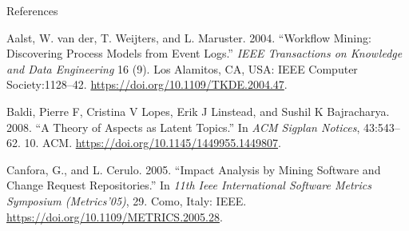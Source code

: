 \documentclass[10pt,ignorenonframetext,serif,onlymath]{beamer}
\begin{document}
\begin{frame}{References}
\protect\hypertarget{sec:references}{}

\hypertarget{refs}{}
\leavevmode\hypertarget{ref-Aalst-etal_2004}{}%
Aalst, W. van der, T. Weijters, and L. Maruster. 2004. “Workflow Mining:
Discovering Process Models from Event Logs.” \emph{IEEE Transactions on
Knowledge and Data Engineering} 16 (9). Los Alamitos, CA, USA: IEEE
Computer Society:1128–42. \url{https://doi.org/10.1109/TKDE.2004.47}.

\leavevmode\hypertarget{ref-Baldi-etal_2008}{}%
Baldi, Pierre F, Cristina V Lopes, Erik J Linstead, and Sushil K
Bajracharya. 2008. “A Theory of Aspects as Latent Topics.” In \emph{ACM
Sigplan Notices}, 43:543–62. 10. ACM.
\url{https://doi.org/10.1145/1449955.1449807}.

\leavevmode\hypertarget{ref-Canfora-Cerulo_2005a}{}%
Canfora, G., and L. Cerulo. 2005. “Impact Analysis by Mining Software
and Change Request Repositories.” In \emph{11th Ieee International
Software Metrics Symposium (Metrics’05)}, 29. Como, Italy: IEEE.
\url{https://doi.org/10.1109/METRICS.2005.28}.

\end{frame}
\end{document}
